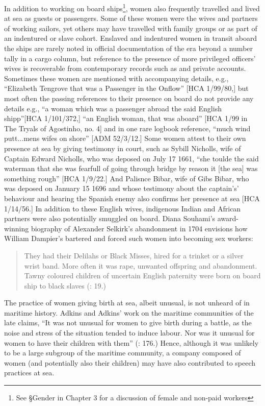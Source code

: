 In addition to working on board ships\footnote{See §Gender in Chapter 3 for a discussion of female  and non-paid workers}, women also frequently travelled and lived at sea as guests or passengers. Some of these women were the wives and partners of working sailors, yet others may have travelled with family groups or as part of an indentured or slave cohort. Enslaved and indentured women in transit aboard the ships are rarely noted in official documentation of the era beyond a number tally in a cargo column, but reference to the presence of more privileged officers’ wives is recoverable from contemporary records such as  and private accounts. Sometimes these women are mentioned with accompanying details, e.g., “Elizabeth Tengrove that was a Passenger in the Onflow” [HCA 1/99/80,] but most often the passing references to their presence on board do not provide any details e.g., “a woman which was a passenger abroad the said English shipp”[HCA 1/101/372,] “an English woman, that was aboard” [HCA 1/99 in The Tryals of Agostinho, no. 4] and in one rare logbook reference, “much wind putt...mens wifes on shore” [ADM 52/3/12.] Some women attest to their own presence at sea by giving testimony in court, such as Sybill Nicholls, wife of Captain Edward Nicholls, who was deposed on July 17 1661, “she toulde the said waterman that she was fearfull of going through bridge by reason it [the sea] was something rough” [HCA 1/9/22.] And Palisnce Bibar, wife of  Gibs Bibar, who was deposed on January 15 1696 and whose testimony about the captain's’ behaviour and hearing the Spanish enemy also confirms her presence at sea [HCA 1/14/56.] In addition to these English wives, indigenous Indian and African partners were also potentially smuggled on board. Diana Souhami’s award-winning biography of Alexander Selkirk’s abandonment in 1704 envisions how William Dampier’s  bartered and forced such women into becoming sex workers:

\begin{quotation}
They had their Delilahs or Black Misses, hired for a trinket or a silver wrist band. More often it was rape, unwanted offspring and abandonment. Tawny coloured children of uncertain English paternity were born on board ship to black slaves (\citealt{Souhami2013}: 19.)\end{quotation}

The practice of women giving birth at sea, albeit unusual, is not unheard of in maritime history. Adkins and Adkins’ work on the maritime communities of the late  claims, “It was not unusual for women to give birth during a battle, as the noise and stress of the situation tended to induce labour. Nor was it unusual for women to have their children with them” (\citealt{AdkinsAdkins2008}: 176.) Hence, although it was unlikely to be a large subgroup of the maritime community, a company composed of women (and potentially also their children) may have also contributed to speech practices at sea. 

